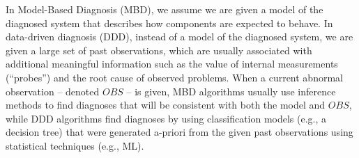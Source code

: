 \documentclass[12pt]{article}
\begin{document}
In Model-Based Diagnosis (MBD), we assume we are given a model of the diagnosed system that describes how components are expected to behave. In data-driven diagnosis (DDD), instead of a model of the diagnosed system, we are given a large set of past observations, which are usually associated with additional meaningful information such as the value of internal measurements (``probes'') and the root cause of observed problems. 
When a current abnormal observation -- denoted $OBS$ -- is given, MBD algorithms usually use inference methods to find diagnoses that will be consistent with both the model and $OBS$, while DDD algorithms find diagnoses by using classification models (e.g., a decision tree) that were generated a-priori from the given past observations using statistical techniques (e.g., ML). 
\end{document}
